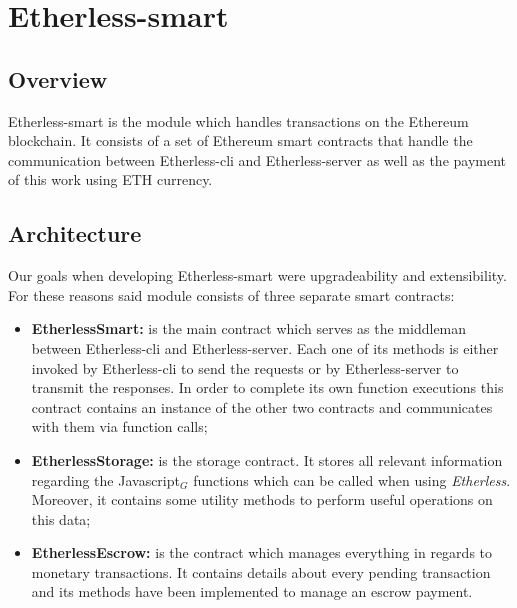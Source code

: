 \section{Etherless-smart}

\subsection{Overview}
	Etherless-smart is the module which handles transactions on the Ethereum blockchain. It consists of a set of Ethereum smart contracts that handle the communication between Etherless-cli and Etherless-server as well as the payment of this work using ETH currency.

\subsection{Architecture} %
		Our goals when developing Etherless-smart were upgradeability and extensibility. For these reasons said module consists of three separate smart contracts:
		\begin{itemize}
			\item \textbf{EtherlessSmart:} is the main contract which serves as the middleman between Etherless-cli and Etherless-server. Each one of its methods is either invoked by Etherless-cli to send the requests or by Etherless-server to transmit the responses. In order to complete its own function executions this contract contains an instance of the other two contracts and communicates with them via function calls;
			\item \textbf{EtherlessStorage:} is the storage contract. It stores all relevant information regarding the Javascript$_{G}$ functions which can be called when using \textit{Etherless}. Moreover, it contains some utility methods to perform useful operations on this data;
			\item \textbf{EtherlessEscrow:} is the contract which manages everything in regards to monetary transactions. It contains details about every pending transaction and its methods have been implemented to manage an escrow payment.
		\end{itemize}

